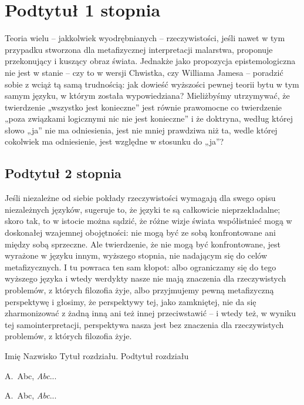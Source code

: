 \section{Podtytuł 1 stopnia}

\noindent Teoria wielu -- jakkolwiek wyodrębnianych -- rzeczywistości, jeśli nawet w tym przypadku stworzona dla metafizycznej interpretacji malarstwa, proponuje przekonujący i kuszący obraz świata. Jednakże jako propozycja epistemologiczna nie jest w stanie -- czy to w wersji Chwistka, czy Williama Jamesa -- poradzić sobie z wciąż tą samą trudnością: jak dowieść wyższości pewnej teorii bytu w tym samym języku, w którym została wypowiedziana? Mieliżbyśmy utrzymywać, że twierdzenie „wszystko jest konieczne” jest równie prawomocne co twierdzenie „poza związkami logicznymi nic nie jest konieczne” i że doktryna, według której słowo „ja” nie ma odniesienia, jest nie mniej prawdziwa niż ta, wedle której cokolwiek ma odniesienie, jest względne w stosunku do „ja”?

\subsection{Podtytuł 2 stopnia}

\noindent Jeśli niezależne od siebie pokłady rzeczywistości wymagają dla swego opisu niezależnych języków, sugeruje to, że języki te są całkowicie nieprzekładalne; skoro tak, to w istocie można sądzić, że różne wizje świata współistnieć mogą w doskonałej wzajemnej obojętności: nie mogą być ze sobą konfrontowane ani między sobą sprzeczne. Ale twierdzenie, że nie mogą być konfrontowane, jest wyrażone w języku innym, wyższego stopnia, nie nadającym się do celów metafizycznych. I tu powraca ten sam kłopot: albo ograniczamy się do tego wyższego języka i wtedy werdykty nasze nie mają znaczenia dla rzeczywistych problemów, z których filozofia żyje, albo przyjmujemy pewną metafizyczną perspektywę i głosimy, że perspektywy tej, jako zamkniętej, nie da się zharmonizować z żadną inną ani też innej przeciwstawić -- i wtedy też, w wyniku tej samointerpretacji, perspektywa nasza jest bez znaczenia dla rzeczywistych problemów, z których filozofia żyje.

\begin{thebibliography}{00}{Imię Nazwisko}
{Tytuł rozdziału. Podtytuł rozdziału}

\makeatletter
    \@clubpenalty \clubpenalty
\makeatother


A.~Abc, \textit{Abc}...

A.~Abc, \textit{Abc}...

\end{thebibliography}